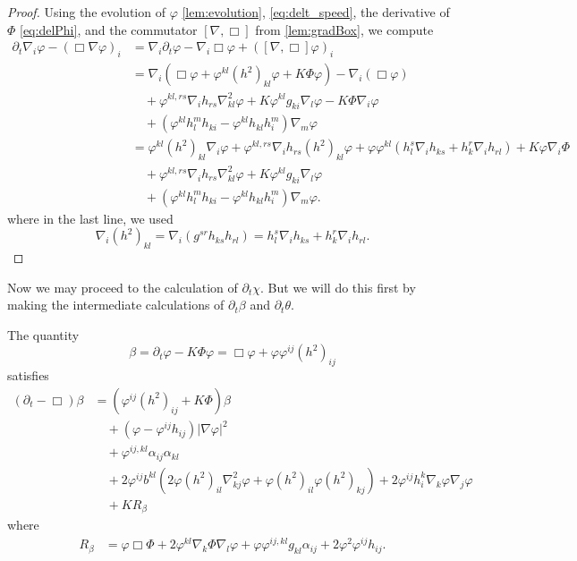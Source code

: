 \documentclass{amsart}
\begin{document}
\begin{proof}
Using the evolution of \(\varphi\) \cref{lem:evolution}, \cref{eq:delt_speed}, the derivative of \(\Phi\) \cref{eq:delPhi}, and the commutator \([\nabla, \Box]\) from \cref{lem:gradBox}, we compute
\[
\begin{split}
\partial_{t}\nabla_i \varphi - (\Box\nabla \varphi)_{i} &= \nabla_i \partial_t \varphi - \nabla_i \Box \varphi + ([\nabla, \Box] \varphi)_i \\
&= \nabla_i \left(\Box\varphi + \varphi^{kl}(h^2)_{kl}\varphi + K \Phi\varphi\right) - \nabla_i (\Box\varphi) \\
&\quad + \varphi^{kl,rs} \nabla_i h_{rs} \nabla^2_{kl} \varphi + K\varphi^{kl}g_{ki} \nabla_l \varphi - K\Phi\nabla_i \varphi \\
&\quad + (\varphi^{kl}h^{m}_{l}h_{ki} - \varphi^{kl}h_{kl}h^{m}_{i}) \nabla_m \varphi \\
&= \varphi^{kl}(h^2)_{kl}\nabla_i \varphi + \varphi^{kl,rs}\nabla_i h_{rs} (h^2)_{kl}\varphi + \varphi\varphi^{kl}(h^s_l \nabla_i h_{ks} + h^r_k \nabla_i h_{rl}) + K \varphi\nabla_i\Phi \\
&\quad + \varphi^{kl,rs} \nabla_i h_{rs} \nabla^2_{kl} \varphi + K\varphi^{kl}g_{ki}\nabla_l \varphi \\
&\quad + (\varphi^{kl}h^{m}_{l}h_{ki} - \varphi^{kl}h_{kl}h^{m}_{i}) \nabla_m \varphi.
\end{split}
\]
where in the last line, we used
\[
\nabla_i (h^2)_{kl} = \nabla_i (g^{sr} h_{ks} h_{rl}) = h^s_l \nabla_i h_{ks} + h^r_k \nabla_i h_{rl}.
\]
\end{proof}

Now we may proceed to the calculation of \(\partial_t \chi\). But we will do this first by making the intermediate calculations of \(\partial_t \beta\) and \(\partial_t \theta\).

\begin{lemma}
\label{lem:evbeta}
The quantity 
\[
\beta = \partial_t \varphi - K\Phi\varphi = \Box\varphi +  \varphi\varphi^{ij} (h^2)_{ij}
\]
satisfies
\[
\begin{split}
(\partial_{t} - \Box)\beta &= \left(\varphi^{ij}(h^2)_{ij} + K\Phi \right)\beta \\
&\quad + (\varphi - \varphi^{ij}h_{ij}) |\nabla\varphi|^{2} \\
&\quad + \varphi^{ij,kl} \alpha_{ij} \alpha_{kl} \\
&\quad + 2\varphi^{ij} b^{kl} (2\varphi(h^2)_{il}\nabla^2_{kj}\varphi + \varphi(h^2)_{il}\varphi(h^2)_{kj}) + 2\varphi^{ij}h^{k}_{i}\nabla_k \varphi \nabla_j \varphi\\
&\quad + KR_{\beta}
\end{split}
\]
where
\[
\begin{split}
R_{\beta} &= \varphi \Box \Phi + 2\varphi^{kl} \nabla_k \Phi \nabla_l \varphi + \varphi \varphi^{ij,kl}g_{kl} \alpha_{ij} + 2\varphi^{2}\varphi^{ij}h_{ij}.
\end{split}
\]
\end{lemma}
\end{document}
